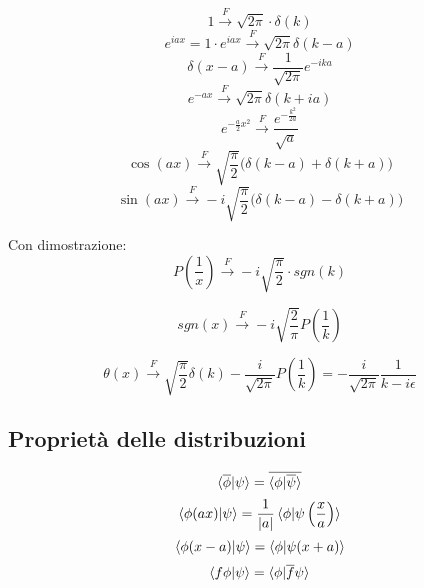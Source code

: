 \documentclass[a4paper, 11pt]{article}
\newcommand{\F}[0]{\overset{F}{\longrightarrow}}{}
\begin{document}
\begin{equation}
    1 \F \sqrt{2\pi}\cdot \delta(k)
\end{equation}
\begin{equation}
    e^{iax}= 1 \cdot e^{iax} \F \sqrt{2 \pi} \delta(k-a)
\end{equation}
\begin{equation}
    \delta (x-a) \F \frac{1}{\sqrt{2\pi}} e^{-ika}
\end{equation}
\begin{equation}
    e^{-ax} \F \sqrt{2\pi}\delta(k+ia) 
\end{equation}
\begin{equation}
    e^{-\frac{a}{2}x^2} \F \frac{e^{-\frac{k^2}{2a}}}{\sqrt{a}}
\end{equation}
\begin{equation}
    \cos(ax) \F \sqrt{\frac{\pi}{2}} \bigg( \delta (k-a) + \delta (k+a) \bigg)
\end{equation}
\begin{equation}
    \sin(ax) \F -i \sqrt{\frac{\pi}{2}} \bigg( \delta (k-a) - \delta (k+a) \bigg)
\end{equation}


\bigskip
Con dimostrazione:
\begin{equation}
    P\left(\frac{1}{x}\right)\F -i\sqrt{\frac{\pi}{2}}\cdot sgn(k)
\end{equation}

\begin{equation}
    sgn(x) \F -i \sqrt{\frac{2}{\pi}} P \left( \frac{1}{k} \right) 
\end{equation}

\begin{equation}
    \theta (x) \F \sqrt{\frac{\pi}{2}} \delta(k) - \frac{i}{\sqrt{2 \pi}} P \left( \frac{1}{k} \right) = - \frac{i}{\sqrt{2 \pi}} \frac{1}{k-i \epsilon} 
\end{equation}


\newpage

\hrulefill
\begin{center}
\section{Proprietà delle distribuzioni}
\end{center}
\begin{equation}
    \braket{\overline{\phi}|\psi} = \overline{\braket{\phi|\overline \psi}}
\end{equation}
\begin{equation}
    \braket{\phi (ax) | \psi} = \frac{1}{|a|} \braket{\phi| \psi \left( \frac{x}{a} \right)}
\end{equation}
\begin{equation}
    \braket{\phi(x-a)|\psi}= \braket{\phi | \psi(x+a)}
\end{equation}
\begin{equation}
    \braket{f \phi | \psi} = \braket{\phi | \overline f \psi}
\end{equation}
\end{document}
